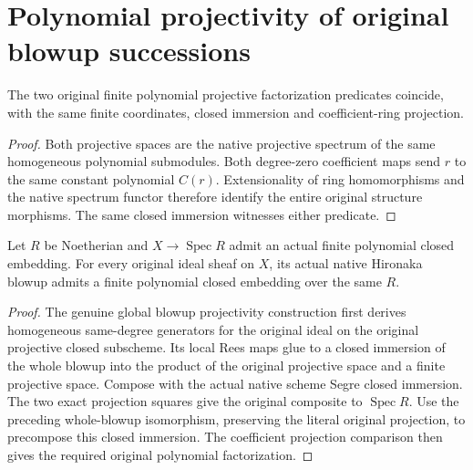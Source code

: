 \section{Polynomial projectivity of original blowup successions}

\begin{lemma}
\label{lem:fc-projective-space-projections-agree}
\leanok
{}
The two original finite polynomial projective factorization predicates coincide,
with the same finite coordinates, closed immersion and coefficient-ring projection.
\end{lemma}
\begin{proof}
Both projective spaces are the native projective spectrum of the same homogeneous
polynomial submodules.  Both degree-zero coefficient maps send $r$ to the same
constant polynomial $C(r)$.  Extensionality of ring homomorphisms and the native
spectrum functor therefore identify the entire original structure morphisms.
The same closed immersion witnesses either predicate.
\end{proof}

\begin{theorem}
\label{thm:fc-original-blowup-polynomial-projectivity}
\leanok
{}
Let $R$ be Noetherian and $X\to\operatorname{Spec}R$ admit an actual finite
polynomial closed embedding.  For every original ideal sheaf on $X$, its actual
native Hironaka blowup admits a finite polynomial closed embedding over the same $R$.
\end{theorem}
\begin{proof}
The genuine global blowup projectivity construction first derives homogeneous
same-degree generators for the original ideal on the original projective closed
subscheme.  Its local Rees maps glue to a closed immersion of the whole blowup
into the product of the original projective space and a finite projective space.
Compose with the actual native scheme Segre closed immersion.  The two exact
projection squares give the original composite to $\operatorname{Spec}R$.
Use the preceding whole-blowup isomorphism, preserving the literal original
projection, to precompose this closed immersion.  The coefficient projection
comparison then gives the required original polynomial factorization.
\end{proof}

